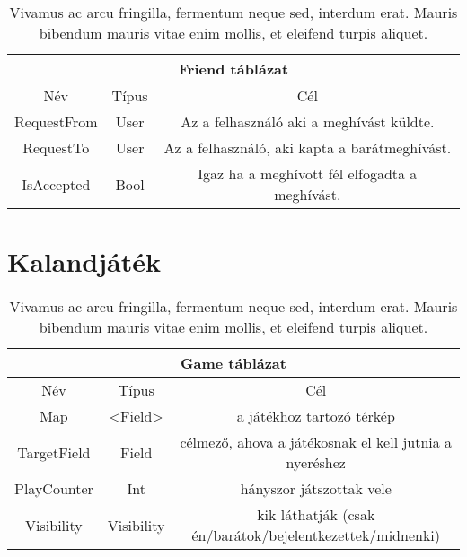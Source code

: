 \begin{table}[htb]
	\centering
	\begin{tabular}{ |c|c|c| }
		\hline
		\multicolumn{3}{|c|}{Friend táblázat}\\
		\hline
		Név & Típus & Cél \\
		\hline
		RequestFrom  & User  & Az a felhasználó aki a meghívást küldte.  \\
		\hline
		RequestTo & User & Az a felhasználó, aki kapta a barátmeghívást.\\
		\hline
		IsAccepted & Bool & Igaz ha a meghívott fél elfogadta a meghívást.\\
		\hline
	\end{tabular}
	\caption[Rövid cím a táblázatjegyzékbe]{Vivamus ac arcu fringilla, fermentum neque sed, interdum erat. Mauris bibendum mauris vitae enim mollis, et eleifend turpis aliquet.}
	\label{tab:example-2}
\end{table}

\section{Kalandjáték}

\begin{table}[htb]
	\centering
	\begin{tabular}{ |c|c|c| }
		\hline
		\multicolumn{3}{|c|}{Game táblázat}\\
		\hline
		Név & Típus & Cél \\
		\hline
		Map  & <Field>  & a játékhoz tartozó térkép  \\
		\hline
		TargetField & Field & célmező, ahova a játékosnak el kell jutnia a nyeréshez\\
		\hline
		PlayCounter & Int & hányszor játszottak vele\\
		\hline
		Visibility & Visibility & kik láthatják \newline (csak én/barátok/bejelentkezettek/midnenki)\\
		\hline
	\end{tabular}
	\caption[Rövid cím a táblázatjegyzékbe]{Vivamus ac arcu fringilla, fermentum neque sed, interdum erat. Mauris bibendum mauris vitae enim mollis, et eleifend turpis aliquet.}
	\label{tab:example-2}
\end{table}

